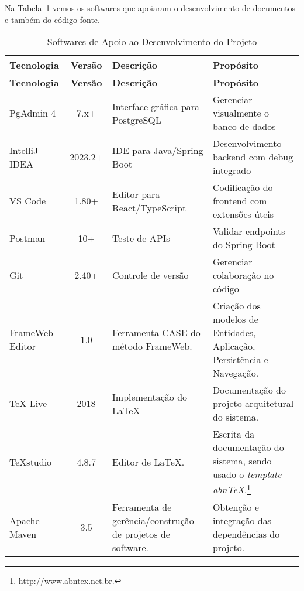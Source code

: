 
Na Tabela~\ref{tabela-software} vemos os softwares que apoiaram o desenvolvimento de documentos e também do código fonte.

\begin{footnotesize}
\begin{longtable}{|p{2.5cm}|c|p{5cm}|p{5.5cm}|}
	\caption{Softwares de Apoio ao Desenvolvimento do Projeto}	
	\label{tabela-software}\\\hline
	
	\rowcolor{lightgray}
	\textbf{Tecnologia} & \textbf{Versão} & \textbf{Descrição} & \textbf{Propósito} \\\hline 
	\endfirsthead
	\hline
	\rowcolor{lightgray}
	\textbf{Tecnologia} & \textbf{Versão} & \textbf{Descrição} & \textbf{Propósito} \\\hline 
	\endhead
	
	PgAdmin 4 & 7.x+ & Interface gráfica para PostgreSQL & Gerenciar visualmente o banco de dados \\\hline
	
	IntelliJ IDEA & 2023.2+ & IDE para Java/Spring Boot & Desenvolvimento backend com debug integrado \\\hline 
	
	VS Code & 1.80+ & Editor para React/TypeScript & Codificação do frontend com extensões úteis \\\hline
	
	Postman & 10+ & Teste de APIs & Validar endpoints do Spring Boot \\\hline 
	
	Git & 2.40+ & Controle de versão & Gerenciar colaboração no código \\\hline 
	 
	FrameWeb Editor & 1.0 & Ferramenta CASE do método FrameWeb. & Criação dos modelos de Entidades, Aplicação, Persistência e Navegação. \\\hline

	TeX Live  & 2018 & Implementação do \LaTeX & Documentação do projeto arquitetural do sistema. \\\hline       
	
	TeXstudio & 4.8.7 & Editor de LaTeX. &  Escrita da documentação do sistema, sendo usado o \textit{template} \textit{abnTeX}.\footnote{\url{http://www.abntex.net.br}.} \\\hline    
	
	Apache Maven & 3.5 & Ferramenta de gerência/construção de projetos de software. & Obtenção e integração das dependências do projeto. \\\hline
\end{longtable}
\end{footnotesize}
